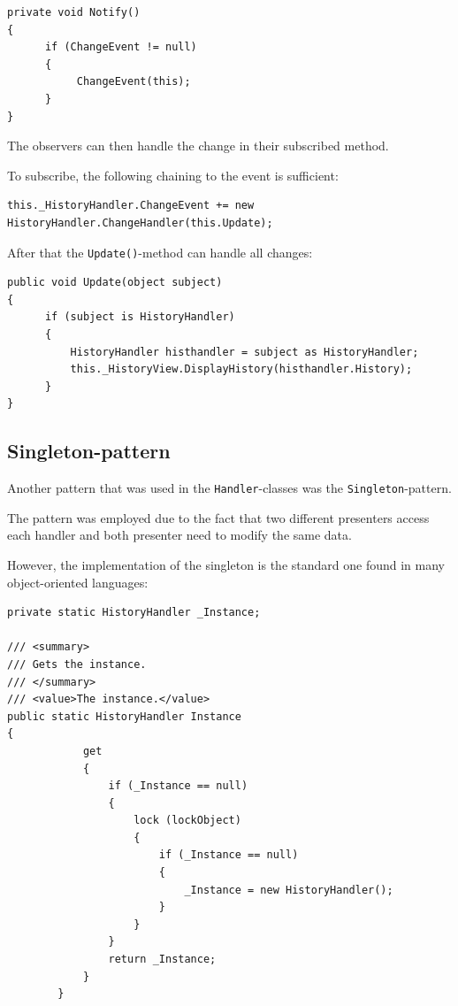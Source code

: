 \begin{lstlisting}[caption=Notifying observers.]
private void Notify()
{
      if (ChangeEvent != null)
      {
           ChangeEvent(this);
      }
}
\end{lstlisting}

The observers can then handle the change in their subscribed method.

To subscribe, the following chaining to the event is sufficient:

\begin{lstlisting}[caption=Registering as an observer.]
this._HistoryHandler.ChangeEvent += new HistoryHandler.ChangeHandler(this.Update);
\end{lstlisting}

After that the \texttt{Update()}-method can handle all changes:

\begin{lstlisting}
public void Update(object subject)
{
      if (subject is HistoryHandler)
      {
          HistoryHandler histhandler = subject as HistoryHandler;
          this._HistoryView.DisplayHistory(histhandler.History);
      }
}
\end{lstlisting}

\subsection{Singleton-pattern}

Another pattern that was used in the \texttt{Handler}-classes was the \texttt{Singleton}-pattern.

The pattern was employed due to the fact that two different presenters access each handler and both presenter need to modify the same data.

However, the implementation of the singleton is the standard one found in many object-oriented languages:

\begin{lstlisting}
private static HistoryHandler _Instance;

/// <summary>
/// Gets the instance.
/// </summary>
/// <value>The instance.</value>
public static HistoryHandler Instance
{
            get
            {
                if (_Instance == null)
                {
                    lock (lockObject)
                    {
                        if (_Instance == null)
                        {
                            _Instance = new HistoryHandler();
                        }
                    }
                }
                return _Instance;
            }
        }
\end{lstlisting}


